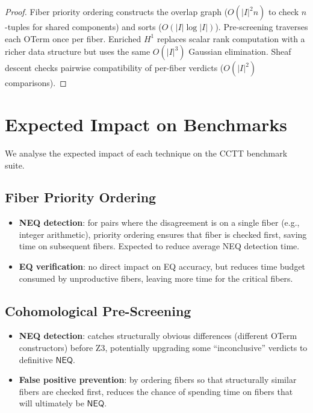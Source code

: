 \begin{proof}
Fiber priority ordering constructs the overlap graph ($O(|I|^2 n)$
to check $n$-tuples for shared components) and sorts ($O(|I| \log |I|)$).
Pre-screening traverses each OTerm once per fiber.
Enriched $H^1$ replaces scalar rank computation with a richer data
structure but uses the same $O(|I|^3)$ Gaussian elimination.
Sheaf descent checks pairwise compatibility of per-fiber verdicts
($O(|I|^2)$ comparisons).
\end{proof}


\section{Expected Impact on Benchmarks}
\label{sec:expected-impact}

We analyse the expected impact of each technique on the CCTT
benchmark suite.

\subsection{Fiber Priority Ordering}

\begin{itemize}
  \item \textbf{NEQ detection}: for pairs where the disagreement is on
    a single fiber (e.g., integer arithmetic), priority ordering
    ensures that fiber is checked first, saving time on subsequent
    fibers.  Expected to reduce average NEQ detection time.
  \item \textbf{EQ verification}: no direct impact on EQ accuracy, but
    reduces time budget consumed by unproductive fibers, leaving more
    time for the critical fibers.
\end{itemize}

\subsection{Cohomological Pre-Screening}

\begin{itemize}
  \item \textbf{NEQ detection}: catches structurally obvious differences
    (different OTerm constructors) before Z3, potentially upgrading
    some ``inconclusive'' verdicts to definitive $\mathsf{NEQ}$.
  \item \textbf{False positive prevention}: by ordering fibers so that
    structurally similar fibers are checked first, reduces the chance
    of spending time on fibers that will ultimately be $\mathsf{NEQ}$.
\end{itemize}

